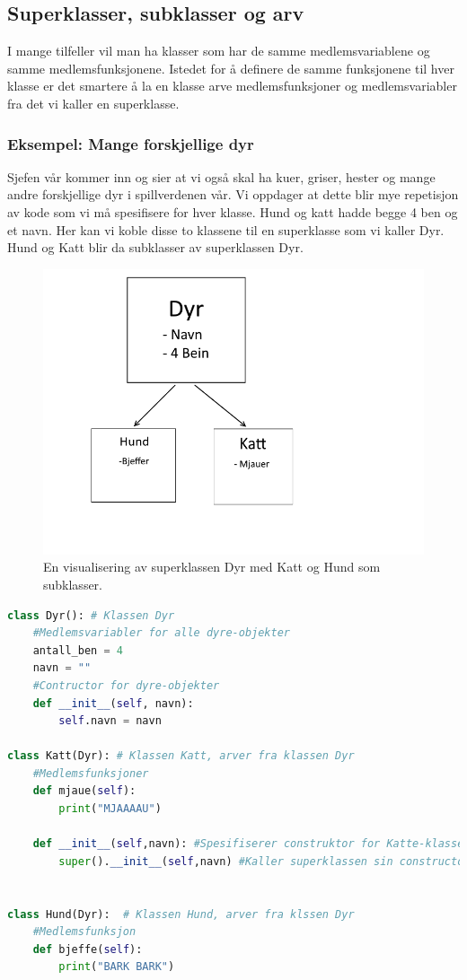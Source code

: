 \clearpage
\subsection{Superklasser, subklasser og arv}
I mange tilfeller vil man ha klasser som har de samme medlemsvariablene og samme medlemsfunksjonene. Istedet for å definere de samme funksjonene til hver klasse er det smartere å la en klasse arve medlemsfunksjoner og medlemsvariabler fra det vi kaller en superklasse. 

\subsubsection{Eksempel: Mange forskjellige dyr}
Sjefen vår kommer inn og sier at vi også skal ha kuer, griser, hester og mange andre forskjellige dyr i spillverdenen vår. Vi oppdager at dette blir mye repetisjon av kode som vi må spesifisere for hver klasse. Hund og katt hadde begge 4 ben og et navn. Her kan vi koble disse to klassene til en superklasse som vi kaller Dyr. Hund og Katt blir da subklasser av superklassen Dyr.\\[2cm]

\begin{figure}[H]
    \centering
    \includegraphics[scale=0.5]{Figures/Klasser_Dyr.png}
    \caption{En visualisering av superklassen Dyr med Katt og Hund som subklasser.}
    \label{fig:uperklasse}
\end{figure}
\clearpage
\begin{lstlisting}[language=python]
class Dyr(): # Klassen Dyr
    #Medlemsvariabler for alle dyre-objekter
    antall_ben = 4
    navn = ""
    #Contructor for dyre-objekter
    def __init__(self, navn):
        self.navn = navn

class Katt(Dyr): # Klassen Katt, arver fra klassen Dyr
    #Medlemsfunksjoner
    def mjaue(self):
        print("MJAAAAU")
        
    def __init__(self,navn): #Spesifiserer construktor for Katte-klassen
        super().__init__(self,navn) #Kaller superklassen sin constructor


class Hund(Dyr):  # Klassen Hund, arver fra klssen Dyr
    #Medlemsfunksjon
    def bjeffe(self):
        print("BARK BARK")
\end{lstlisting}

